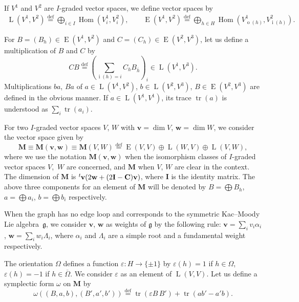 \documentclass[10pt,a4paper]{amsart}
\theoremstyle{definition}
\numberwithin{equation}{section}
\newcommand{\lsp}[2]{{\mskip-.3mu}{}^{#1}\mskip-1mu{#2}}
\newcommand{\defeq}{\overset{\operatorname{\scriptstyle def}}{=}}
\newcommand{\g}{{\mathfrak g}}
\newcommand{\Hom}{\operatorname{Hom}}
\newcommand{\tr}{\operatorname{tr}}
\newcommand{\vin}[1]{\operatorname{i}(#1)} %
\newcommand{\vout}[1]{\operatorname{o}(#1)} %
\newcommand{\bM}{{\mathbf M}} %
\newcommand{\bv}{{\mathbf v}} %
\newcommand{\bw}{{\mathbf w}} %
\newcommand{\bC}{{\mathbf C}} %
\newcommand{\bI}{{\mathbf I}} %
\newcommand{\HomE}{\operatorname{E}}
\newcommand{\HomL}{\operatorname{L}}
\begin{document}
If $V^1$ and $V^2$ are $I$-graded vector spaces, we def\/ine vector spaces by
\begin{gather*}
  \HomL(V^1, V^2) \defeq
  \bigoplus_{i\in I} \Hom(V^1_i, V^2_i), \qquad
  \HomE(V^1, V^2) \defeq
  \bigoplus_{h\in H} \Hom(V^1_{\vout{h}}, V^2_{\vin{h}})
  .
\end{gather*}


For $B = (B_h) \in \HomE(V^1, V^2)$ and
$C = (C_h) \in \HomE(V^2, V^3)$, let us def\/ine a multiplication of $B$
and $C$ by
\[
  CB \defeq \left(\sum_{\vin{h} = i} C_h B_{\overline h}\right)_i \in
  \HomL(V^1, V^3).
\]
Multiplications $ba$, $Ba$ of $a\in \HomL(V^1,V^2)$, $b\in\HomL(V^2,
V^3)$, $B\in \HomE(V^2, V^3)$ are def\/ined in the obvious manner. If
$a\in\HomL(V^1, V^1)$, its trace $\tr(a)$ is understood as $\sum_i
\tr(a_i)$.

For two $I$-graded vector spaces $V$, $W$ with $\bv = \dim V$, $\bw =
\dim W$, we consider the vector space given by
\begin{equation*}\label{def:bM}
  \bM \equiv \bM(\bv,\bw) \equiv \bM(V, W) \defeq
  \HomE(V,V)\oplus \HomL(W,V)\oplus \HomL(V,W),
\end{equation*}
where we use the notation $\bM(\bv,\bw)$ when the isomorphism classes
of $I$-graded vector spaces $V$,~$W$ are concerned, and $\bM$ when
$V$, $W$ are clear in the context.
%
The dimension of $\bM$ is $\lsp{t}{\bv}(2\bw + (2\bI - \bC)\bv)$,
where $\bI$ is the identity matrix.
The above three components for an element of $\bM$ will be denoted by
$B = \bigoplus B_h $, $a = \bigoplus a_i$, $b = \bigoplus b_i$
respectively.

When the graph has no edge loop and corresponds to the symmetric
Kac--Moody Lie algeb\-ra~$\g$, we consider $\bv$, $\bw$ as weights of
$\g$ by the following rule: $\bv = \sum_i v_i \alpha_i$, $\bw = \sum_i
w_i\Lambda_i$, where $\alpha_i$ and $\Lambda_i$ are a simple root and
a fundamental weight respectively.

The orientation $\Omega$ def\/ines a function $\varepsilon\colon H \to
\{ \pm 1\}$ by $\varepsilon(h) = 1$ if $h\in\Omega$, $\varepsilon(h)=
-1$ if $h\in\overline\Omega$. We consider $\varepsilon$ as an element
of $\HomL(V, V)$.
%
Let us def\/ine a symplectic form $\omega$ on $\bM$ by
\begin{equation*}
        \omega((B, a, b), (B', a', b'))
        \defeq \tr(\varepsilon B\, B') + \tr(a b' - a' b).
\label{def:symplectic}\end{equation*}
\end{document}
